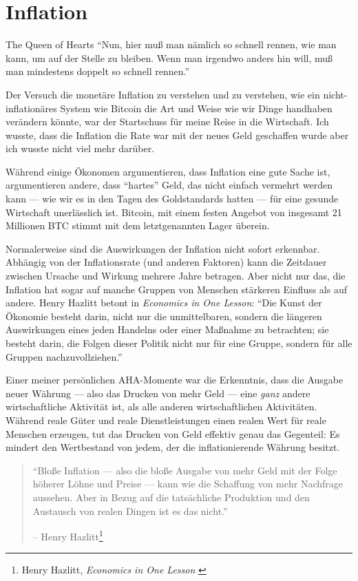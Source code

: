 \chapter{Inflation}
\label{les:9}

\begin{chapquote}{The Queen of Hearts}
\enquote{Nun, hier muß man nämlich so schnell rennen, wie man kann, um auf der
Stelle zu bleiben. Wenn man irgendwo anders hin will, muß man mindestens doppelt
so schnell rennen.}
\end{chapquote}

Der Versuch die monetäre Inflation zu verstehen und zu verstehen, wie ein
nicht-inflationäres System wie Bitcoin die Art und Weise wie wir Dinge handhaben
verändern könnte, war der Startschuss für meine Reise in die Wirtschaft. Ich
wusste, dass die Inflation die Rate war mit der neues Geld geschaffen wurde aber
ich wusste nicht viel mehr darüber.

Während einige Ökonomen argumentieren, dass Inflation eine gute Sache ist,
argumentieren andere, dass \enquote{hartes} Geld, das nicht einfach vermehrt
werden kann — wie wir es in den Tagen des Goldstandards hatten --- für eine
gesunde Wirtschaft unerlässlich ist. Bitcoin, mit einem festen Angebot von
insgesamt 21 Millionen BTC stimmt mit dem letztgenannten Lager überein.

Normalerweise sind die Auswirkungen der Inflation nicht sofort erkennbar.
Abhängig von der Inflationsrate (und anderen Faktoren) kann die Zeitdauer
zwischen Ursache und Wirkung mehrere Jahre betragen. Aber nicht nur das, die
Inflation hat sogar auf manche Gruppen von Menschen stärkeren Einfluss als auf
andere. Henry Hazlitt betont in \textit{Economics in One Lesson}: \enquote{Die
Kunst der Ökonomie besteht darin, nicht nur die unmittelbaren, sondern die
längeren Auswirkungen eines jeden Handelns oder einer Maßnahme zu betrachten;
sie besteht darin, die Folgen dieser Politik nicht nur für eine Gruppe, sondern
für alle Gruppen nachzuvollziehen.}

Einer meiner persönlichen AHA-Momente war die Erkenntnis, dass die Ausgabe neuer
Währung --- also das Drucken von mehr Geld --- eine \textit{ganz} andere
wirtschaftliche Aktivität ist, als alle anderen wirtschaftlichen Aktivitäten.
Während reale Güter und reale Dienstleistungen einen realen Wert für reale
Menschen erzeugen, tut das Drucken von Geld effektiv genau das Gegenteil: Es
mindert den Wertbestand von jedem, der die inflationierende Währung besitzt.

\begin{quotation}\begin{samepage}
\enquote{Bloße Inflation --- also die bloße Ausgabe von mehr Geld mit der Folge
höherer Löhne und Preise --- kann wie die Schaffung von mehr Nachfrage aussehen.
Aber in Bezug auf die tatsächliche Produktion und den Austausch von realen
Dingen ist es das nicht.}
\begin{flushright} -- Henry Hazlitt\footnote{Henry Hazlitt, \textit{Economics in
One Lesson} \cite{hazlitt}}
\end{flushright}\end{samepage}\end{quotation}

